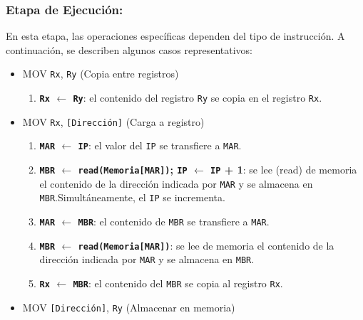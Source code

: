 \documentclass[12pt,oneside]{templates/unerthesis}
\providecommand{\tightlist}{%
  \setlength{\itemsep}{0pt}\setlength{\parskip}{0pt}}
\begin{document}
\hypertarget{etapa-de-ejecuciuxf3n}{%
\subsubsection{Etapa de Ejecución:}\label{etapa-de-ejecuciuxf3n}}

En esta etapa, las operaciones específicas dependen del tipo de instrucción. A continuación, se describen algunos casos representativos:

\begin{itemize}
\tightlist
\item
  MOV \texttt{Rx}, \texttt{Ry} (Copia entre registros)

  \begin{enumerate}
  \def\labelenumi{\arabic{enumi}.}
  \tightlist
  \item
    \textbf{\texttt{Rx} \(\leftarrow\) \texttt{Ry}}:
    el contenido del registro \texttt{Ry} se copia en el registro \texttt{Rx}.
  \end{enumerate}
\item
  MOV \texttt{Rx}, \texttt{{[}Dirección{]}} (Carga a registro)

  \begin{enumerate}
  \def\labelenumi{\arabic{enumi}.}
  \tightlist
  \item
    \textbf{\texttt{MAR} \(\leftarrow\) \texttt{IP}}:
    el valor del \texttt{IP} se transfiere a \texttt{MAR}.
  \item
    \textbf{\texttt{MBR} \(\leftarrow\) \texttt{read(Memoria{[}MAR{]})}; \texttt{IP} \(\leftarrow\) \texttt{IP} + 1}:
    se lee (read) de memoria el contenido de la dirección indicada por \texttt{MAR} y se almacena en \texttt{MBR}.Simultáneamente, el \texttt{IP} se incrementa.
  \item
    \textbf{\texttt{MAR} \(\leftarrow\) \texttt{MBR}}:
    el contenido de \texttt{MBR} se transfiere a \texttt{MAR}.
  \item
    \textbf{\texttt{MBR} \(\leftarrow\) \texttt{read(Memoria{[}MAR{]})}}:
    se lee de memoria el contenido de la dirección indicada por \texttt{MAR} y se almacena en \texttt{MBR}.
  \item
    \textbf{\texttt{Rx} \(\leftarrow\) \texttt{MBR}}:
    el contenido del \texttt{MBR} se copia al registro \texttt{Rx}.
  \end{enumerate}
\item
  MOV \texttt{{[}Dirección{]}}, \texttt{Ry} (Almacenar en memoria)


\end{itemize}
\end{document}
